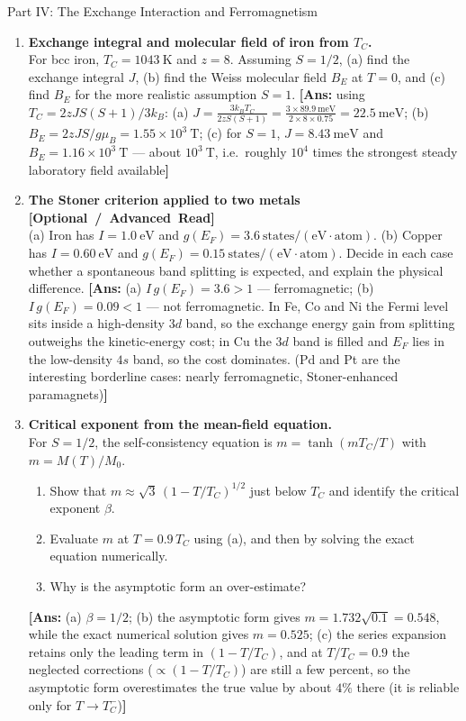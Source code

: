 \documentclass[11pt,a4paper]{article}
\newcommand{\extratag}{\hfill\mbox{\normalfont\footnotesize\sffamily\color{secondary}\textbf{[Optional / Advanced Read]}}}
\begin{document}
\begin{assignmentbox}{Part IV: The Exchange Interaction and Ferromagnetism}
\begin{enumerate}[label=\textbf{IV.\arabic*.}, leftmargin=*]
    \item \textbf{Exchange integral and molecular field of iron from $T_C$.}\\
    For bcc iron, $T_C = 1043\ \mathrm{K}$ and $z = 8$. Assuming $S = 1/2$, (a) find the exchange integral $J$, (b) find the Weiss molecular field $B_E$ at $T = 0$, and (c) find $B_E$ for the more realistic assumption $S = 1$.
    \textbf{[Ans:} using $T_C = 2zJS(S+1)/3k_B$: (a) $J = \frac{3k_BT_C}{2zS(S+1)} = \frac{3\times89.9\ \mathrm{meV}}{2\times8\times0.75} = 22.5\ \mathrm{meV}$; (b) $B_E = 2zJS/g\mu_B = 1.55\times10^{3}\ \mathrm{T}$; (c) for $S=1$, $J = 8.43\ \mathrm{meV}$ and $B_E = 1.16\times10^{3}\ \mathrm{T}$ --- about $10^{3}\ \mathrm{T}$, i.e.\ roughly $10^{4}$ times the strongest steady laboratory field available\textbf{]}

    \item \textbf{The Stoner criterion applied to two metals \extratag}\\
    (a) Iron has $I = 1.0\ \mathrm{eV}$ and $g(E_F) = 3.6\ \mathrm{states/(eV\cdot atom)}$. (b) Copper has $I = 0.60\ \mathrm{eV}$ and $g(E_F) = 0.15\ \mathrm{states/(eV\cdot atom)}$. Decide in each case whether a spontaneous band splitting is expected, and explain the physical difference.
    \textbf{[Ans:} (a) $I\,g(E_F) = 3.6 > 1$ --- ferromagnetic; (b) $I\,g(E_F) = 0.09 < 1$ --- not ferromagnetic. In Fe, Co and Ni the Fermi level sits inside a high-density $3d$ band, so the exchange energy gain from splitting outweighs the kinetic-energy cost; in Cu the $3d$ band is filled and $E_F$ lies in the low-density $4s$ band, so the cost dominates. (Pd and Pt are the interesting borderline cases: nearly ferromagnetic, Stoner-enhanced paramagnets)\textbf{]}

    \item \textbf{Critical exponent from the mean-field equation.}\\
    For $S = 1/2$, the self-consistency equation is $m = \tanh(mT_C/T)$ with $m = M(T)/M_0$.
    \begin{enumerate}[label=(\alph*)]
        \item Show that $m \approx \sqrt{3}\,(1 - T/T_C)^{1/2}$ just below $T_C$ and identify the critical exponent $\beta$.
        \item Evaluate $m$ at $T = 0.9\,T_C$ using (a), and then by solving the exact equation numerically.
        \item Why is the asymptotic form an over-estimate?
    \end{enumerate}
    \textbf{[Ans:} (a) $\beta = 1/2$; (b) the asymptotic form gives $m = 1.732\sqrt{0.1} = 0.548$, while the exact numerical solution gives $m = 0.525$; (c) the series expansion retains only the leading term in $(1-T/T_C)$, and at $T/T_C = 0.9$ the neglected corrections ($\propto (1-T/T_C)$) are still a few percent, so the asymptotic form overestimates the true value by about $4\%$ there (it is reliable only for $T \to T_C^-$)\textbf{]}


\end{enumerate}
\end{assignmentbox}
\end{document}
